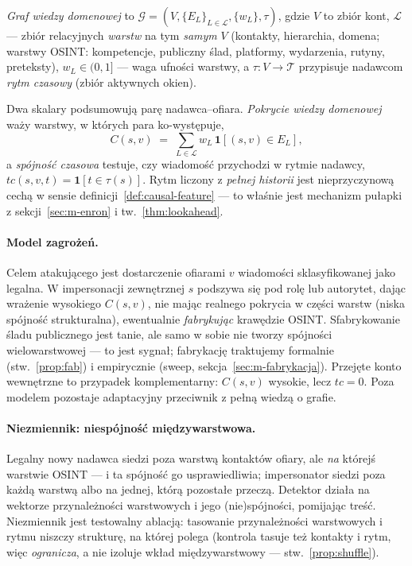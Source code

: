 \begin{definition}
\label{def:m-dkg}
\emph{Graf wiedzy domenowej} to
$\mathcal{G}=(V,\{E_L\}_{L\in\mathcal{L}},\{w_L\},\tau)$, gdzie $V$
to zbiór kont, $\mathcal{L}$ --- zbiór relacyjnych \emph{warstw} na
tym \emph{samym} $V$ (kontakty, hierarchia, domena; warstwy OSINT:
kompetencje, publiczny ślad, platformy, wydarzenia, rutyny,
preteksty), $w_L\in(0,1]$ --- waga ufności warstwy, a
$\tau\colon V\to\mathcal{T}$ przypisuje nadawcom \emph{rytm czasowy}
(zbiór aktywnych okien).
\end{definition}

Dwa skalary podsumowują parę nadawca--ofiara. \emph{Pokrycie wiedzy
domenowej} waży warstwy, w których para ko-występuje,
\begin{equation}
C(s,v)\;=\;\sum_{L\in\mathcal{L}} w_L\,\mathbf{1}\!\left[(s,v)\in E_L\right],
\label{eq:m-coverage}
\end{equation}
a \emph{spójność czasowa} testuje, czy wiadomość przychodzi
w rytmie nadawcy, $tc(s,v,t)=\mathbf{1}[t\in\tau(s)]$. Rytm liczony
z \emph{pełnej historii} jest nieprzyczynową cechą w sensie
definicji~\ref{def:causal-feature} --- to właśnie jest mechanizm
pułapki z sekcji~\ref{sec:m-enron} i tw.~\ref{thm:lookahead}.

\paragraph{Model zagrożeń.} Celem atakującego jest dostarczenie
ofiarami $v$ wiadomości sklasyfikowanej jako legalna. W
impersonacji zewnętrznej $s$ podszywa się pod rolę lub autorytet,
dając wrażenie wysokiego $C(s,v)$, nie mając realnego pokrycia
w części warstw (niska spójność strukturalna), ewentualnie
\emph{fabrykując} krawędzie OSINT. Sfabrykowanie śladu publicznego
jest tanie, ale samo w sobie nie tworzy spójności wielowarstwowej ---
to jest sygnał; fabrykację traktujemy formalnie (stw.~\ref{prop:fab})
i empirycznie (sweep, sekcja~\ref{sec:m-fabrykacja}). Przejęte konto
wewnętrzne to przypadek komplementarny: $C(s,v)$ wysokie, lecz
$tc=0$. Poza modelem pozostaje adaptacyjny przeciwnik z pełną
wiedzą o grafie.

\paragraph{Niezmiennik: niespójność międzywarstwowa.}
Legalny nowy nadawca siedzi poza warstwą kontaktów ofiary, ale
\emph{na} którejś warstwie OSINT --- i ta spójność go usprawiedliwia;
impersonator siedzi poza każdą warstwą albo na jednej, którą
pozostałe przeczą. Detektor działa na wektorze przynależności
warstwowych i jego (nie)spójności, pomijając treść. Niezmiennik jest
testowalny ablacją: tasowanie przynależności warstwowych i rytmu
niszczy strukturę, na której polega (kontrola tasuje też kontakty
i rytm, więc \emph{ogranicza}, a nie izoluje wkład międzywarstwowy
--- stw.~\ref{prop:shuffle}).

